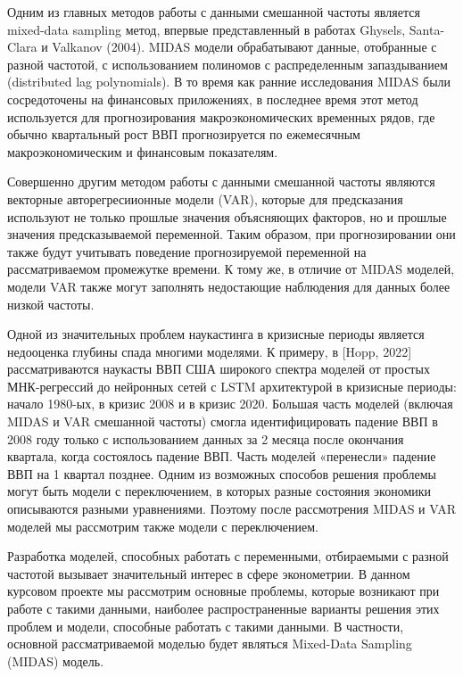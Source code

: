 \documentclass[a4paper, 12pt]{extarticle}
\numberwithin{equation}{subsection}
\begin{document}
	Одним из главных методов работы с данными смешанной частоты является mixed-data sampling метод, впервые представленный в работах Ghysels, Santa-Clara и Valkanov (2004). MIDAS модели
	обрабатывают данные, отобранные с разной частотой, с
	использованием полиномов с распределенным запаздыванием (distributed lag polynomials). В то время как ранние исследования MIDAS были сосредоточены на финансовых
	приложениях, в последнее время этот метод
	используется для прогнозирования макроэкономических временных рядов, где обычно квартальный
	рост ВВП прогнозируется по ежемесячным макроэкономическим и финансовым показателям.
	
	Совершенно другим методом работы с данными смешанной частоты являются векторные авторегресиионные модели (VAR), которые для предсказания используют не только прошлые значения объясняющих факторов, но и прошлые значения предсказываемой переменной. Таким образом, при прогнозировании они также будут учитывать поведение прогнозируемой переменной на рассматриваемом промежутке времени. К тому же, в отличие от MIDAS моделей, модели VAR также могут заполнять недостающие наблюдения для данных более низкой частоты.
	
	Одной из значительных проблем наукастинга в кризисные периоды является недооценка глубины спада многими моделями. К примеру, в [Hopp, 2022] рассматриваются наукасты ВВП США широкого спектра моделей от простых МНК-регрессий до нейронных сетей с LSTM архитектурой в кризисные периоды: начало 1980-ых, в кризис 2008 и в кризис 2020. Большая часть моделей (включая MIDAS и VAR смешанной частоты) смогла идентифицировать падение ВВП в 2008 году только с использованием данных за 2 месяца после окончания квартала, когда состоялось падение ВВП. Часть моделей «перенесли» падение ВВП на 1 квартал позднее. Одним из возможных способов решения проблемы могут быть модели с переключением, в которых разные состояния экономики описываются разными уравнениями. Поэтому после рассмотрения MIDAS и VAR моделей мы рассмотрим также модели с переключением. 
	
	Разработка моделей, способных работать с переменными, отбираемыми с разной частотой вызывает значительный интерес в сфере эконометрии. В данном курсовом проекте мы рассмотрим основные проблемы, которые возникают при работе с такими данными, наиболее распространенные варианты решения этих проблем и модели, способные работать с такими данными. В частности, основной рассматриваемой моделью будет являться Mixed-Data Sampling (MIDAS) модель.
	
\end{document}
